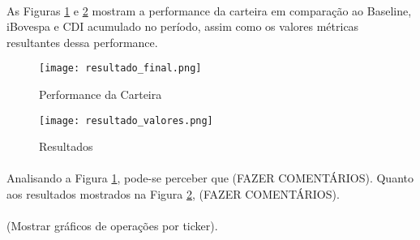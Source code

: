 \paragraph{} As Figuras \ref{fig:300} e \ref{fig:301} mostram a performance da carteira em comparação ao Baseline, iBovespa e CDI acumulado no período, assim como os valores métricas resultantes dessa performance.

\begin{figure}[h]
    \texttt{[image: resultado\_final.png]}
    \centering
    \caption{Performance da Carteira}
    \label{fig:300}
\end{figure}

\begin{figure}[h]
    \texttt{[image: resultado\_valores.png]}
    \centering
    \caption{Resultados}
    \label{fig:301}
\end{figure}

\paragraph{} Analisando a Figura \ref{fig:300}, pode-se perceber que (FAZER COMENTÁRIOS). Quanto aos resultados mostrados na Figura \ref{fig:301}, (FAZER COMENTÁRIOS).

\paragraph{} (Mostrar gráficos de operações por ticker).
